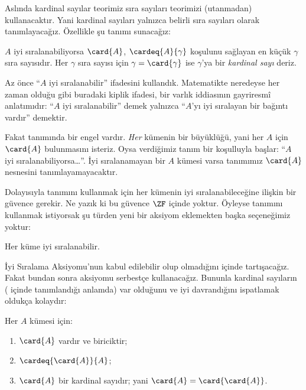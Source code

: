 


Aslında kardinal sayılar teorimiz sıra sayıları teorimizi (utanmadan)
kullanacaktır. Yani kardinal sayıları yalnızca belirli sıra sayıları olarak
tanımlayacağız. Özellikle şu tanımı sunacağız:

\begin{defn}
$A$ iyi sıralanabiliyorsa $\card{A}$, $\cardeq{A}{\gamma}$ koşulunu
sağlayan en küçük $\gamma$ sıra sayısıdır. Her $\gamma$ sıra sayısı için
$\gamma=\card{\gamma}$ ise $\gamma$'ya bir \emph{kardinal sayı} deriz.
\end{defn}

Az önce ``$A$ iyi sıralanabilir'' ifadesini kullandık. Matematikte neredeyse
her zaman olduğu gibi buradaki kiplik ifadesi, bir varlık iddiasının
gayriresmî anlatımıdır: ``$A$ iyi sıralanabilir'' demek yalnızca ``$A$'yı
iyi sıralayan bir bağıntı vardır'' demektir.

Fakat  tanımında bir engel vardır. \emph{Her}
kümenin bir büyüklüğü, yani her $A$ için $\card{A}$ bulunmasını isteriz.
Oysa verdiğimiz tanım bir koşulluyla başlar: ``$A$ iyi
sıralanabiliyorsa\ldots''. İyi sıralanamayan bir $A$ kümesi varsa tanımımız
$\card{A}$ nesnesini tanımlayamayacaktır.

Dolayısıyla  tanımını kullanmak için her kümenin
iyi sıralanabileceğine ilişkin bir güvence gerekir. Ne yazık ki bu güvence
$\ZF$ içinde yoktur. Öyleyse  tanımını
kullanmak istiyorsak şu türden yeni bir aksiyom eklemekten başka seçeneğimiz
yoktur:
\begin{axiom}
Her küme iyi sıralanabilir.
\end{axiom}
İyi Sıralama Aksiyomu'nun kabul edilebilir olup olmadığını
 içinde tartışacağız. Fakat bundan sonra aksiyomu
serbestçe kullanacağız. Bununla kardinal sayıların
( içinde tanımlandığı anlamda) var olduğunu ve
iyi davrandığını ispatlamak oldukça kolaydır:

\begin{lem}
Her $A$ kümesi için:
\begin{enumerate}
	\item{} $\card{A}$ vardır ve biriciktir;
	\item{} $\cardeq{\card{A}}{A}$;
	\item{} $\card{A}$ bir kardinal sayıdır; yani
	$\card{A}=\card{\card{A}}$.
\end{enumerate}
\end{lem}

